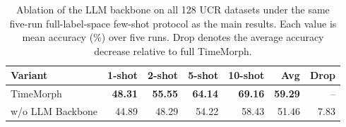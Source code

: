 \begin{table}[t]
\centering
\caption{Ablation of the LLM backbone on all 128 UCR datasets under the same five-run full-label-space few-shot protocol as the main results. Each value is mean accuracy (\%) over five runs. Drop denotes the average accuracy decrease relative to full TimeMorph.}
\label{tab:ablation-llm-backbone}
\begin{tabular}{lrrrrrr}
\toprule
Variant & 1-shot & 2-shot & 5-shot & 10-shot & Avg & Drop \\
\midrule
TimeMorph & \textbf{48.31} & \textbf{55.55} & \textbf{64.14} & \textbf{69.16} & \textbf{59.29} & -- \\
w/o LLM Backbone & 44.89 & 48.29 & 54.22 & 58.43 & 51.46 & 7.83 \\
\bottomrule
\end{tabular}
\end{table}
